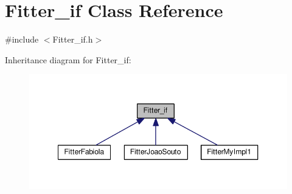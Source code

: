 \hypertarget{class_fitter__if}{\section{Fitter\-\_\-if Class Reference}
\label{class_fitter__if}
}


{\ttfamily \#include $<$Fitter\-\_\-if.\-h$>$}



Inheritance diagram for Fitter\-\_\-if\-:
\nopagebreak
\begin{figure}[H]
\begin{center}
\leavevmode
\includegraphics[width=350pt]{class_fitter__if__inherit__graph}
\end{center}
\end{figure}
